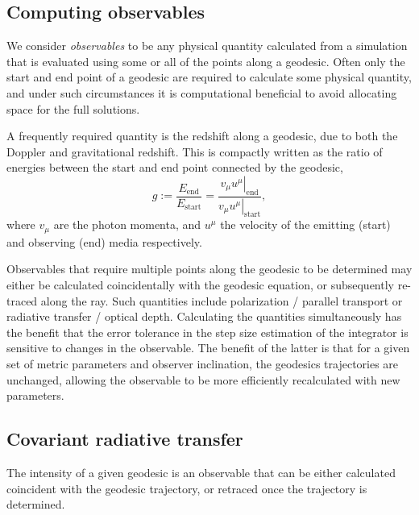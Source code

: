 \subsection{Computing observables}

We consider \textit{observables} to be any physical quantity calculated from a simulation that is evaluated using some or all of the points along a geodesic. Often only the start and end point of a geodesic are required to calculate some physical quantity, and under such circumstances it is computational beneficial to avoid allocating space for the full solutions.

A frequently required quantity is the redshift along a geodesic, due to both the Doppler and gravitational redshift. This is compactly written as the ratio of energies between the start and end point connected by the geodesic,
\begin{equation}
\label{eq:redshift}
g := \frac{E_\text{end}}{E_\text{start}} = \frac{\left. v_\mu u^\mu \right\rvert_\text{end}}{\left. v_\mu u^\mu \right\rvert_{\text{start}}},
\end{equation}
where $v_\mu$ are the photon momenta, and $u^\mu$ the velocity of the emitting (start) and observing (end) media respectively.

Observables that require multiple points along the geodesic to be determined may either be calculated coincidentally with the geodesic equation, or subsequently re-traced along the ray. Such quantities include polarization / parallel transport or radiative transfer / optical depth. Calculating the quantities simultaneously has the benefit that the error tolerance in the step size estimation of the integrator is sensitive to changes in the observable. The benefit of the latter is that for a given set of metric parameters and observer inclination, the geodesics trajectories are unchanged, allowing the observable to be more efficiently recalculated with new parameters.

\subsection{Covariant radiative transfer}

The intensity of a given geodesic is an observable that can be either calculated coincident with the geodesic trajectory, or retraced once the trajectory is determined.

